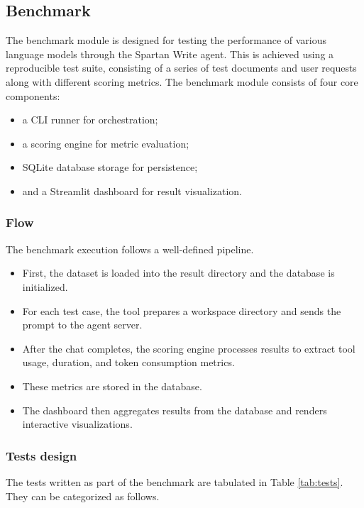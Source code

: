 \subsection{Benchmark}

The benchmark module is designed for testing the performance of various language models through the Spartan Write agent.
This is achieved using a reproducible test suite, consisting of a series of test documents and user requests along with different scoring metrics.
The benchmark module consists of four core components:
\begin{itemize}
    \item a CLI runner for orchestration;
    \item a scoring engine for metric evaluation;
    \item SQLite database storage for persistence;
    \item and a Streamlit dashboard for result visualization.
\end{itemize}

\subsubsection{Flow}

The benchmark execution follows a well-defined pipeline.
\begin{itemize}
    \item First, the dataset is loaded into the result directory and the database is initialized.
    \item For each test case, the tool prepares a workspace directory and sends the prompt to the agent server.
    \item After the chat completes, the scoring engine processes results to extract tool usage, duration, and token consumption metrics.
    \item These metrics are stored in the database.
    \item The dashboard then aggregates results from the database and renders interactive visualizations.
\end{itemize}

\subsubsection{Tests design}

The tests written as part of the benchmark are tabulated in Table \ref{tab:tests}.
They can be categorized as follows.


